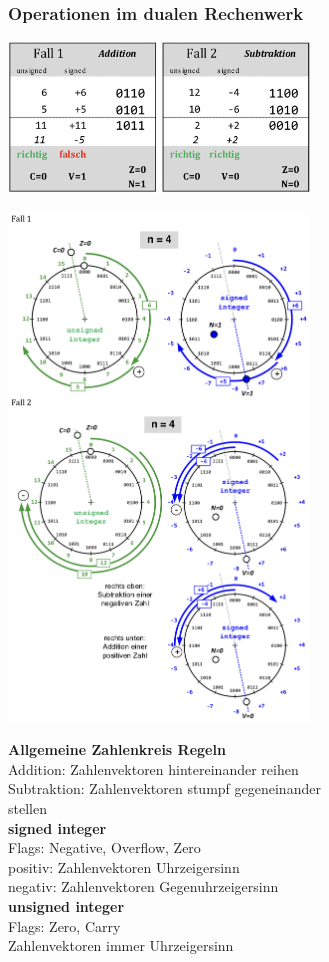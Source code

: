 \begin{minipage}[t]{8cm}
	\vspace{-4ex}
	\subsubsection{Operationen im dualen Rechenwerk}
	\includegraphics[width = 8cm]{pics/Bsp-Zahlenkreis-Zahlen}
	
	\includegraphics[width = 8cm]{pics/Bsp-Zahlenkreis}
	\begin{tabbing}
		\textbf{Al}\= \textbf{lgemeine Zahlenkreis Regeln}\\
		\> Addition: Zahlenvektoren hintereinander reihen\\
		\> Subtraktion: Zahlenvektoren stumpf gegeneinander\\
		\> stellen\\

		\textbf{signed integer}\\
		\> Flags: Negative, Overflow, Zero\\
		\> positiv: Zahlenvektoren Uhrzeigersinn\\
		\> negativ: Zahlenvektoren Gegenuhrzeigersinn\\
	
		\textbf{unsigned integer}\\
		\> Flags: Zero, Carry\\
		\> Zahlenvektoren immer Uhrzeigersinn\\
	\end{tabbing}
\end{minipage}

